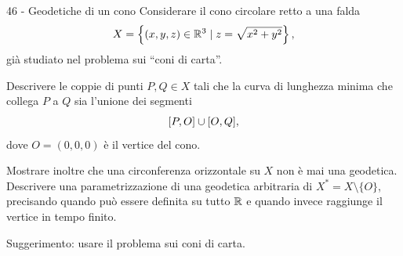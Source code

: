 \documentclass[a4paper]{article}
\begin{document}
\begin{snippetexercise}{46 - Geodetiche di un cono}
    Considerare il cono circolare retto a una falda
    \[
        X=
        \left\{
            (x,y,z)\in\mathbb{R}^3
            \mid
            z=\sqrt{x^2+y^2}
        \right\},
    \]
    già studiato nel problema sui ``coni di carta''.

    Descrivere le coppie di punti \(P,Q\in X\) tali che la curva di
    lunghezza minima che collega \(P\) a \(Q\) sia l'unione dei segmenti
    \[
        [P,O]\cup[O,Q],
    \]
    dove \(O=(0,0,0)\) è il vertice del cono.

    Mostrare inoltre che una circonferenza orizzontale su \(X\) non è
    mai una geodetica. Descrivere una parametrizzazione di una
    geodetica arbitraria di \(X^*=X\setminus\{O\}\), precisando quando
    può essere definita su tutto \(\mathbb{R}\) e quando invece
    raggiunge il vertice in tempo finito.

    Suggerimento: usare il problema sui coni di carta.
\end{snippetexercise}
\end{document}
